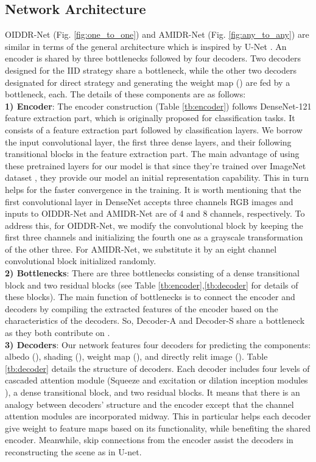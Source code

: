 \documentclass[final]{cvpr}
\newcommand{\smallsqueezeup}{\vspace{-2mm}}
\begin{document}
\subsection{Network Architecture}\smallsqueezeup
OIDDR-Net (Fig. \ref{fig:one_to_one}) and AMIDR-Net (Fig. \ref{fig:any_to_any}) are similar in terms of the general architecture which is inspired by U-Net \cite{45,4}. An encoder is shared by three bottlenecks followed by four decoders. Two decoders designed for the IID strategy share a bottleneck, while the other two decoders designated for direct strategy and generating the weight map () are fed by a bottleneck, each. The details of these components are as follows:\\
\textbf{1) Encoder}: The encoder construction (Table \ref{tb:encoder}) follows DenseNet-121 \cite{22} feature extraction part, which is originally proposed for classification tasks. It consists of a feature extraction part followed by classification layers. We borrow the input convolutional layer, the first three dense layers, and their following transitional blocks in the feature extraction part. The main advantage of using these pretrained layers for our model is that since they're trained over ImageNet dataset \cite{47}, they provide our model an initial representation capability. This in turn helps for the faster convergence in the training. It is worth mentioning that the first convolutional layer in DenseNet accepts three channels RGB images and inputs to OIDDR-Net and AMIDR-Net are of 4 and 8 channels, respectively. To address this, for OIDDR-Net, we modify the convolutional block by keeping the first three channels and initializing the fourth one as a grayscale transformation of the other three. For AMIDR-Net, we substitute it by an eight channel convolutional block initialized randomly.\\
\textbf{2) Bottlenecks}: There are three bottlenecks consisting of a dense transitional block and two residual blocks (see Table \ref{tb:encoder},\ref{tb:decoder} for details of these blocks). The main function of bottlenecks is to connect the encoder and decoders by compiling the extracted features of the encoder based on the characteristics of the decoders. So, Decoder-A and Decoder-S share a bottleneck as they both contribute on .\\
\textbf{3) Decoders}: Our network features four decoders for predicting the components: albedo (), shading (), weight map (), and directly relit image (). Table \ref{tb:decoder} details the structure of decoders. Each decoder includes four levels of cascaded attention module (Squeeze and excitation \cite{48} or dilation inception modules \cite{30}), a dense transitional block, and two residual blocks. It means that there is an analogy between decoders' structure and the encoder except that the channel attention modules are incorporated midway. This in particular helps each decoder give weight to feature maps based on its functionality, while benefiting the shared encoder. Meanwhile, skip connections from the encoder assist the decoders in reconstructing the scene as in U-net.\\
\end{document}
